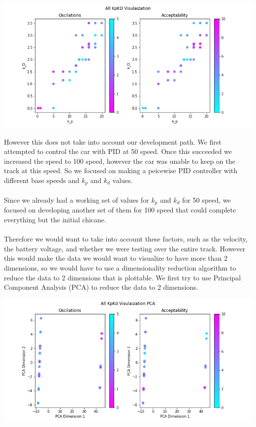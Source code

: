 \documentclass[12pt]{article}
\begin{document}
\begin{multicols}{2}
\begin{center}
\centering
\includegraphics*[scale=0.3]{KpKiAll.png}
\end{center}
However this does not take into account our development path. 
We first attempted to control the car with PID at 50 speed. Once this succeeded we increased the speed to 
100 speed, however the car was unable to keep on the track at this speed. So we focused on making a peicewise PID controller with different base speeds and 
$k_p$ and $k_d$ values.\\\\
 Since we already had a working set of values for $k_p$ and $k_d$ for 50 speed, we focused on developing another set of
them for 100 speed that could complete everything but the initial chicane. \\\\
Therefore we would want to take into account these factors, such as the velocity, the battery voltage, and whether we were testing over the 
entire track. However this would make the data we would want to visualize to have more than 2 dimensions, so we would
have to use a dimensionality reduction algorithm to reduce the data to 2 dimensions that is plottable. We first try to use
Principal Component Analysis (PCA) to reduce the data to 2 dimensions.
\begin{center}
    \includegraphics*[scale=0.3]{KpKiAllPCA.png}

\end{center}
\end{multicols}
\end{document}
